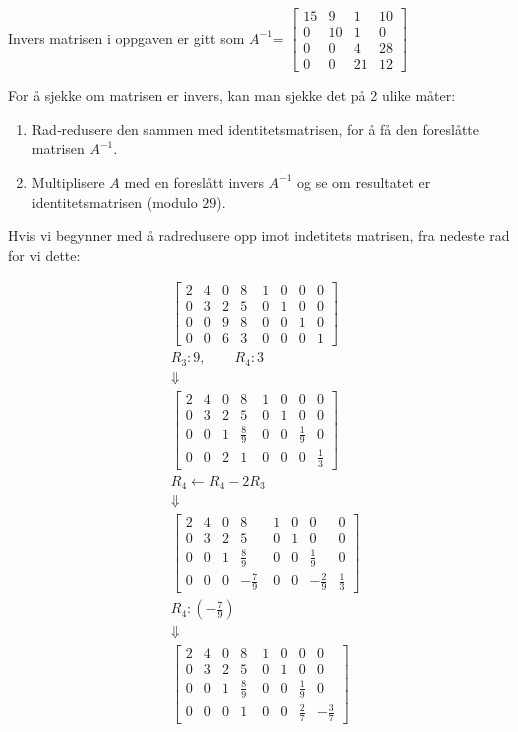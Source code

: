 \documentclass[12pt,a4paper]{article}
\begin{document}
Invers matrisen i oppgaven er gitt som $A^{-1}$=
$
\begin{bmatrix} 15 & 9 & 1 & 10\\[4pt] 0 & 10 & 1 & 0 \\[4pt] 0 & 0 & 4 & 28\\[4pt] 0 & 0 & 21 & 12 \end{bmatrix} $

\vspace{5mm} For å sjekke om matrisen er invers, kan man sjekke det på 2 ulike måter: \begin{enumerate} \item Rad‑redusere den sammen med identitetsmatrisen, for å få den foreslåtte matrisen  $A^{-1}$. \item Multiplisere $A$ med en foreslått invers $A^{-1}$ og se om resultatet er identitetsmatrisen (modulo $29$). \end{enumerate} Hvis vi begynner med å radredusere opp imot indetitets matrisen, fra nedeste rad for vi dette: 
\vspace{2mm}

\[ \begin{aligned} & \begin{bmatrix} 2&4&0&8&\;1&0&0&0\\ 0&3&2&5&\;0&1&0&0\\ 0&0&9&8&\;0&0&1&0\\ 0&0&6&3&\;0&0&0&1 \end{bmatrix} \\[6pt] & R_3 : 9,\qquad R_4 : 3 \\[6pt] &\Downarrow \\[6pt] & \begin{bmatrix} 2&4&0&8&\;1&0&0&0\\ 0&3&2&5&\;0&1&0&0\\ 0&0&1&\tfrac89&\;0&0&\tfrac19&0\\ 0&0&2&1&\;0&0&0&\tfrac13 \end{bmatrix} \\[6pt] & R_4 \leftarrow R_4-2R_3 \\[6pt] &\Downarrow \\[6pt] & \begin{bmatrix} 2&4&0&8&\;1&0&0&0\\ 0&3&2&5&\;0&1&0&0\\ 0&0&1&\tfrac89&\;0&0&\tfrac19&0\\ 0&0&0&-\tfrac79&\;0&0&-\tfrac29&\tfrac13 \end{bmatrix} \\[6pt] & R_4 : \left(-\tfrac79\right) \\[6pt] &\Downarrow \\[6pt] & \begin{bmatrix} 2&4&0&8&\;1&0&0&0\\ 0&3&2&5&\;0&1&0&0\\ 0&0&1&\tfrac89&\;0&0&\tfrac19&0\\ 0&0&0&1&\;0&0&\tfrac27&-\tfrac37 \end{bmatrix} \end{aligned} \]
\end{document}
